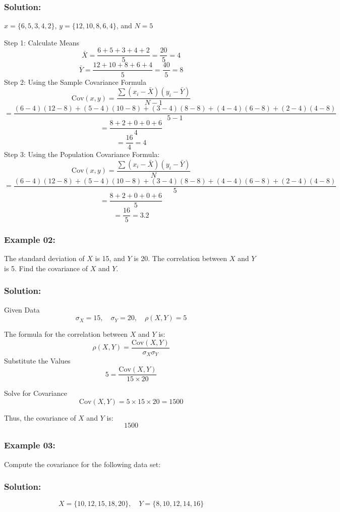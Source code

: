 \documentclass[12pt]{article}
\begin{document}
\subsubsection*{\hspace{0.5cm}Solution:}
\( x = \{6, 5, 3, 4, 2\} \), \( y = \{12, 10, 8, 6, 4\} \), and \( N = 5 \)

Step 1: Calculate Means
\[
\bar{X} = \frac{6 + 5 + 3 + 4 + 2}{5} = \frac{20}{5} = 4
\]
\[
\bar{Y} = \frac{12 + 10 + 8 + 6 + 4}{5} = \frac{40}{5} = 8
\]
Step 2: Using the Sample Covariance Formula
\[
\text{Cov}(x, y) = \frac{\sum (x_i - \bar{X}) (y_i - \bar{Y})}{N - 1}
\]
\[
= \frac{(6 - 4)(12 - 8) + (5 - 4)(10 - 8) + (3 - 4)(8 - 8) + (4 - 4)(6 - 8) + (2 - 4)(4 - 8)}{5 - 1}
\]
\[
= \frac{8 + 2 + 0 + 0 + 6}{4}
\]
\[
= \frac{16}{4} = 4
\]
Step 3: Using the Population Covariance Formula:
\[
\text{Cov}(x, y) = \frac{\sum (x_i - \bar{X}) (y_i - \bar{Y})}{N}
\]
\[
= \frac{(6 - 4)(12 - 8) + (5 - 4)(10 - 8) + (3 - 4)(8 - 8) + (4 - 4)(6 - 8) + (2 - 4)(4 - 8)}{5}
\]
\[
= \frac{8 + 2 + 0 + 0 + 6}{5}
\]
\[
= \frac{16}{5} = 3.2
\]
\subsubsection*{\hspace{0.5cm}Example 02:}
The standard deviation of \(X\) is 15, and \(Y\) is 20. The correlation between \(X\) and \(Y\) is 5. Find the covariance of \(X\) and \(Y\).
\subsubsection*{\hspace{0.5cm}Solution:}
Given Data
\[
\sigma_X = 15, \quad \sigma_Y = 20, \quad \rho(X, Y) = 5
\]

The formula for the correlation between \(X\) and \(Y\) is:
\[
\rho(X, Y) = \frac{\text{Cov}(X, Y)}{\sigma_X \sigma_Y}
\]
{Substitute the Values}
\[
5 = \frac{\text{Cov}(X, Y)}{15 \times 20}
\]

Solve for Covariance
\[
\text{Cov}(X, Y) = 5 \times 15 \times 20 = 1500
\]

Thus, the covariance of \(X\) and \(Y\) is:
\[
\boxed{1500}
\]

\subsubsection*{\hspace{0.5cm}Example 03:}
Compute the covariance for the following data set:
\subsubsection*{\hspace{0.5cm}Solution:}
\[
X = \{10, 12, 15, 18, 20\}, \quad Y = \{8, 10, 12, 14, 16\}
\]
\end{document}
